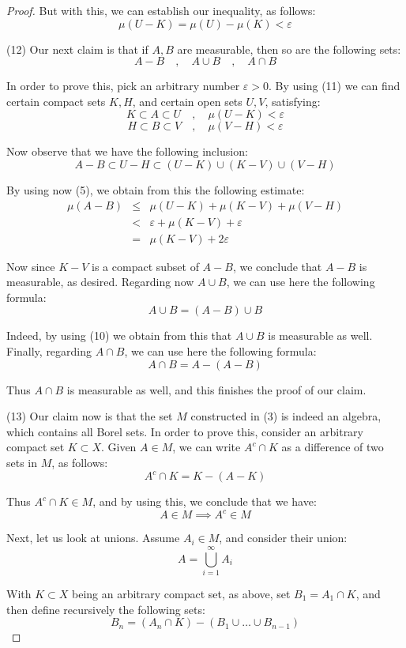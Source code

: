 \documentclass[12pt]{amsbook}
\begin{document}
\begin{proof}
But with this, we can establish our inequality, as follows:
$$\mu(U-K)
=\mu(U)-\mu(K)<\varepsilon$$

(12) Our next claim is that if $A,B$ are measurable, then so are the following sets:
$$A-B\quad,\quad A\cup B\quad,\quad A\cap B$$

In order to prove this, pick an arbitrary number $\varepsilon>0$. By using (11) we can find certain compact sets $K,H$, and certain open sets $U,V$, satisfying:
$$K\subset A\subset U\quad,\quad \mu(U-K)<\varepsilon$$
$$H\subset B\subset V\quad,\quad \mu(V-H)<\varepsilon$$

Now observe that we have the following inclusion:
$$A-B
\subset U-H
\subset(U-K)\cup(K-V)\cup(V-H)$$

By using now (5), we obtain from this the following estimate:
\begin{eqnarray*}
\mu(A-B)
&\leq&\mu(U-K)+\mu(K-V)+\mu(V-H)\\
&<&\varepsilon+\mu(K-V)+\varepsilon\\
&=&\mu(K-V)+2\varepsilon
\end{eqnarray*}

Now since $K-V$ is a compact subset of $A-B$, we conclude that $A-B$ is measurable, as desired. Regarding now $A\cup B$, we can use here the following formula:
$$A\cup B=(A-B)\cup B$$

Indeed, by using (10) we obtain from this that $A\cup B$ is measurable as well. Finally, regarding  $A\cap B$, we can use here the following formula:
$$A\cap B=A-(A-B)$$

Thus $A\cap B$ is measurable as well, and this finishes the proof of our claim.

\medskip

(13) Our claim now is that the set $M$ constructed in (3) is indeed an algebra, which contains all Borel sets. In order to prove this, consider an arbitrary compact set $K\subset X$. Given $A\in M$, we can write $A^c\cap K$ as a difference of two sets in $M$, as follows:
$$A^c\cap K=K-(A-K)$$

Thus $A^c\cap K\in M$, and by using this, we conclude that we have:
$$A\in M\implies A^c\in M$$

Next, let us look at unions. Assume $A_i\in M$, and consider their union:
$$A=\bigcup_{i=1}^\infty A_i$$

With $K\subset X$ being an arbitrary compact set, as above, set $B_1=A_1\cap K$, and then define recursively the following sets:
$$B_n=(A_n\cap K)-(B_1\cup\ldots\cup B_{n-1})$$


\end{proof}
\end{document}
